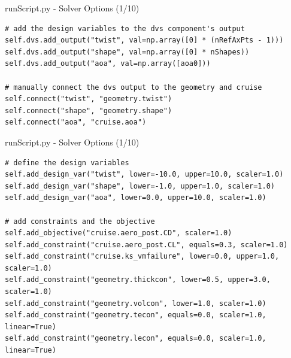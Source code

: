 \documentclass{bredelebeamer}
\begin{document}
\begin{frame}[fragile]{runScript.py - Solver Options (1/10)}
\scriptsize
\lstset{ language=bash }
\begin{lstlisting}
# add the design variables to the dvs component's output
self.dvs.add_output("twist", val=np.array([0] * (nRefAxPts - 1)))
self.dvs.add_output("shape", val=np.array([0] * nShapes))
self.dvs.add_output("aoa", val=np.array([aoa0]))

# manually connect the dvs output to the geometry and cruise
self.connect("twist", "geometry.twist")
self.connect("shape", "geometry.shape")
self.connect("aoa", "cruise.aoa")
\end{lstlisting}
\normalsize
\end{frame}

\begin{frame}[fragile]{runScript.py - Solver Options (1/10)}
\scriptsize
\lstset{ language=bash }
\begin{lstlisting}
# define the design variables
self.add_design_var("twist", lower=-10.0, upper=10.0, scaler=1.0)
self.add_design_var("shape", lower=-1.0, upper=1.0, scaler=1.0)
self.add_design_var("aoa", lower=0.0, upper=10.0, scaler=1.0)

# add constraints and the objective
self.add_objective("cruise.aero_post.CD", scaler=1.0)
self.add_constraint("cruise.aero_post.CL", equals=0.3, scaler=1.0)
self.add_constraint("cruise.ks_vmfailure", lower=0.0, upper=1.0, scaler=1.0)
self.add_constraint("geometry.thickcon", lower=0.5, upper=3.0, scaler=1.0)
self.add_constraint("geometry.volcon", lower=1.0, scaler=1.0)
self.add_constraint("geometry.tecon", equals=0.0, scaler=1.0, linear=True)
self.add_constraint("geometry.lecon", equals=0.0, scaler=1.0, linear=True)
\end{lstlisting}
\normalsize
\end{frame}
\end{document}
